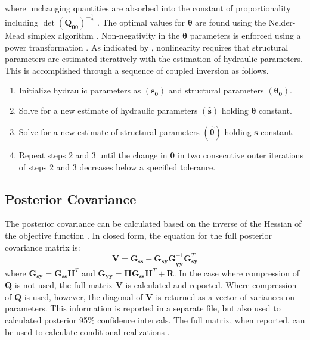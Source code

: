 \documentclass[11pt,oneside,onecolumn]{usgsreport}
\begin{document}
\begin{appendix}
\begin{bibunit}
where unchanging quantities are absorbed into the constant of proportionality
including $\det\left(\mathbf{Q}_{\mathbf{\theta\theta}}\right)^{-\frac{1}{2}}$
. The optimal values for $\mathbf{\theta}$ are found using the Nelder-Mead
simplex algorithm \citep[e.g. ][p. 408-410]{Press1992}. Non-negativity
in the $\mathbf{\theta}$ parameters is enforced using a power transformation
\citep{BoxCox1964}. As indicated by \citet{Kitanidis1995}, nonlinearity
requires that structural parameters are estimated iteratively with
the estimation of hydraulic parameters. This is accomplished through
a sequence of coupled inversion as follows.
\begin{enumerate}
\item Initialize hydraulic parameters as $\left(\mathbf{s_{0}}\right)$
and structural parameters $\left(\mathbf{\theta_{0}}\right)$. 
\item Solve for a new estimate of hydraulic parameters $\left(\hat{\mathbf{s}}\right)$
holding $\mathbf{\theta}$ constant. 
\item Solve for a new estimate of structural parameters $\left(\mathbf{\hat{\theta}}\right)$
holding $\mathbf{s}$ constant. 
\item Repeat steps 2 and 3 until the change in $\mathbf{\theta}$ in two
consecutive outer iterations of steps 2 and 3 decreases below a specified
tolerance. 
\end{enumerate}

\subsection{Posterior Covariance}

The posterior covariance can be calculated based on the inverse of
the Hessian of the objective function \citep[for example, ][]{NowakCirpka2004}.
In closed form, the equation for the full posterior covariance matrix
is:
\[
\mathbf{V}=\mathbf{\mathbf{G}_{ss}}-\mathbf{G_{sy}G}_{\mathbf{yy}}^{-1}\mathbf{G}_{\mathbf{sy}}^{T}
\]
 where $\mathbf{G_{sy}}=\mathbf{G_{ss}H}^{T}$ and $\mathbf{G_{yy}}=\mathbf{HG_{ss}H}^{T}+\mathbf{R}$.
In the case where compression of $\mathbf{Q}$ is not used, the full
matrix $\mathbf{V}$ is calculated and reported. Where compression
of $\mathbf{Q}$ is used, however, the diagonal of $\mathbf{V}$ is
returned as a vector of variances on parameters. This information
is reported in a separate file, but also used to calculated posterior
95\% confidence intervals. The full matrix, when reported, can be
used to calculate conditional realizations \citep{Kitanidis1995,Kitanidis1996ana}.

\end{bibunit}
\end{appendix}
\end{document}
